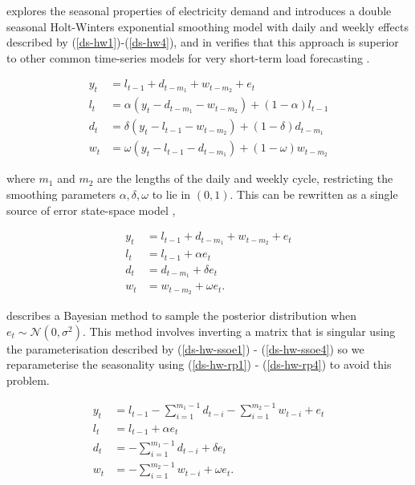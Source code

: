 \documentclass{article}\usepackage[]{graphicx}\usepackage[]{color}
\begin{document}
\citet{Taylor2003} explores the seasonal properties of electricity demand and introduces a double seasonal Holt-Winters exponential smoothing model with daily and weekly effects described by (\ref{ds-hw1})-(\ref{ds-hw4}), and in \citet{Taylor2008} verifies that this approach is superior to other common time-series models for very short-term load forecasting \citep{Taylor2008}.

\begin{align}
y_t &= l_{t-1} + d_{t-m_1} + w_{t-m_2} + e_t \label{ds-hw1} \\
l_t &= \alpha (y_t - d_{t-m_1} - w_{t-m_2}) + (1 - \alpha)l_{t-1} \label{ds-hw2}\\
d_t &= \delta (y_t - l_{t-1} - w_{t-m_2}) + (1 - \delta)d_{t-m_1} \label{ds-hw3} \\
w_t &= \omega (y_t - l_{t-1} - d_{t-m_1}) + (1 - \omega)w_{t-m_2} \label{ds-hw4}
\end{align}

where $m_1$ and $m_2$ are the lengths of the daily and weekly cycle, restricting the smoothing parameters $\alpha, \delta, \omega$ to lie in $(0, 1)$. This can be rewritten as a single source of error state-space model \citep{Snyder1985},

\begin{align}
y_t &= l_{t-1} + d_{t-m_1} + w_{t-m_2} + e_t \label{ds-hw-ssoe1} \\
l_t &= l_{t-1} + \alpha e_t \label{ds-hw-ssoe2} \\
d_t &= d_{t-m_1} + \delta e_t \label{ds-hw-ssoe3} \\
w_t &= w_{t-m_2} + \omega e_t \label{ds-hw-ssoe4}. 
\end{align}

\citet{Forbes2000} describes a Bayesian method to sample the posterior distribution  when $e_t \sim \mathcal{N}(0, \sigma^2)$. This method involves inverting a matrix that is singular using the parameterisation described by (\ref{ds-hw-ssoe1}) - (\ref{ds-hw-ssoe4}) so we reparameterise the seasonality using (\ref{ds-hw-rp1}) - (\ref{ds-hw-rp4}) to avoid this problem.

\begin{align}
y_t &= l_{t-1} - \sum_{i = 1}^{m_1 - 1}d_{t-i} - \sum_{i = 1}^{m_2 - 1}w_{t-i} + e_t \label{ds-hw-rp1} \\
l_t &= l_{t-1} + \alpha e_t \label{ds-hw-rp2} \\
d_t &= - \sum_{i = 1}^{m_1 - 1}d_{t-i} + \delta e_t \label{ds-hw-rp3} \\
w_t &= - \sum_{i = 1}^{m_2 - 1}w_{t-i} + \omega e_t \label{ds-hw-rp4}.
\end{align}
\end{document}
